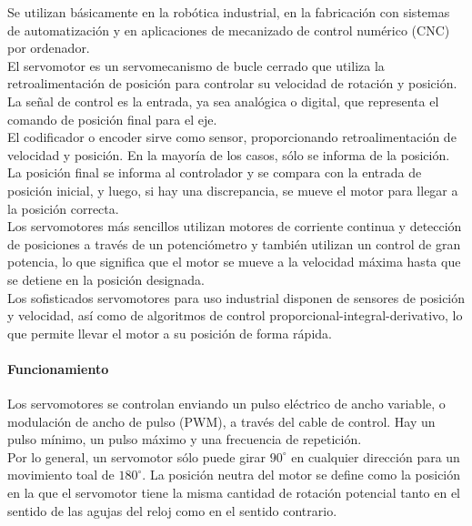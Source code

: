\documentclass[12pt,titlepage]{article}
\begin{document}
Se utilizan básicamente en la robótica industrial, en la fabricación con sistemas de automatización y en aplicaciones de mecanizado de control numérico (CNC) por ordenador. \\ 

El servomotor es un servomecanismo de bucle cerrado que utiliza la retroalimentación de posición para controlar su velocidad de rotación y posición. La señal de control es la entrada, ya sea analógica o digital, que representa el comando de posición final para el eje. \\ 

El codificador o encoder sirve como sensor, proporcionando retroalimentación de velocidad y posición. En la mayoría de los casos, sólo se informa de la posición. La posición final se informa al controlador y se compara con la entrada de posición inicial, y luego, si hay una discrepancia, se mueve el motor para llegar a la posición correcta. \\

Los servomotores más sencillos utilizan motores de corriente continua y detección de posiciones a través de un potenciómetro y también utilizan un control de gran potencia, lo que significa que el motor se mueve a la velocidad máxima hasta que se detiene en la posición designada. \\ 

Los sofisticados servomotores para  uso industrial disponen de sensores de posición y velocidad, así como de algoritmos de control proporcional-integral-derivativo, lo que permite llevar el motor a su posición de forma rápida. \\ 

\paragraph{Funcionamiento}\leavevmode\newline
Los servomotores se controlan enviando un pulso eléctrico de ancho variable, o modulación de ancho de pulso (PWM), a través del cable de control. Hay un pulso mínimo, un pulso máximo y una frecuencia de repetición. \\ 

Por lo general, un servomotor sólo puede girar $90^{\circ}$ en cualquier dirección para un movimiento toal de $180^{\circ}$. La posición neutra del motor se define como la posición en la que el servomotor tiene la misma cantidad de rotación potencial tanto en el sentido de las agujas del reloj como en el sentido contrario. \\ 
\end{document}

